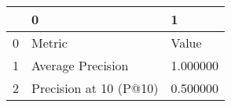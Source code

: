 \begin{tabular}{lll}
\toprule
 & 0 & 1 \\
\midrule
0 & Metric & Value \\
1 & Average Precision & 1.000000 \\
2 & Precision at 10 (P@10) & 0.500000 \\
\bottomrule
\end{tabular}
